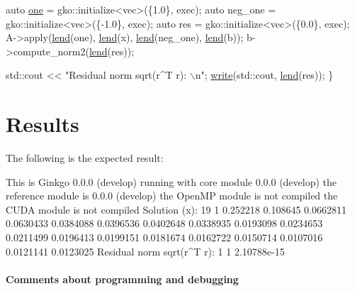 \begin{DoxyCode}
    \textcolor{keyword}{auto} \hyperlink{namespacegko_a0059e27f8f4bc348ff65c1e60caf47c8}{one} = gko::initialize<vec>(\{1.0\}, exec);
    \textcolor{keyword}{auto} neg\_one = gko::initialize<vec>(\{-1.0\}, exec);
    \textcolor{keyword}{auto} res = gko::initialize<vec>(\{0.0\}, exec);
    A->apply(\hyperlink{namespacegko_aa8cb4876b72e5e1036ea9575443c439b}{lend}(one), \hyperlink{namespacegko_aa8cb4876b72e5e1036ea9575443c439b}{lend}(x), \hyperlink{namespacegko_aa8cb4876b72e5e1036ea9575443c439b}{lend}(neg\_one), \hyperlink{namespacegko_aa8cb4876b72e5e1036ea9575443c439b}{lend}(b));
    b->compute\_norm2(\hyperlink{namespacegko_aa8cb4876b72e5e1036ea9575443c439b}{lend}(res));

    std::cout << \textcolor{stringliteral}{"Residual norm sqrt(r^T r): \(\backslash\)n"};
    \hyperlink{namespacegko_a859dc47a462721d83728d91ab7fa2148}{write}(std::cout, \hyperlink{namespacegko_aa8cb4876b72e5e1036ea9575443c439b}{lend}(res));
\}
\end{DoxyCode}
 \label{_Results}%
\section*{Results}

The following is the expected result\+:


\begin{DoxyCode}
This is Ginkgo 0.0.0 (develop)
    running with core module 0.0.0 (develop)
    the reference module is  0.0.0 (develop)
    the OpenMP    module is  not compiled
    the CUDA      module is  not compiled
Solution (x):
19 1
0.252218
0.108645
0.0662811
0.0630433
0.0384088
0.0396536
0.0402648
0.0338935
0.0193098
0.0234653
0.0211499
0.0196413
0.0199151
0.0181674
0.0162722
0.0150714
0.0107016
0.0121141
0.0123025
Residual norm sqrt(r^T r):
1 1
2.10788e-15
\end{DoxyCode}


\label{_Commentsaboutprogramminganddebugging}%
\paragraph*{Comments about programming and debugging }

